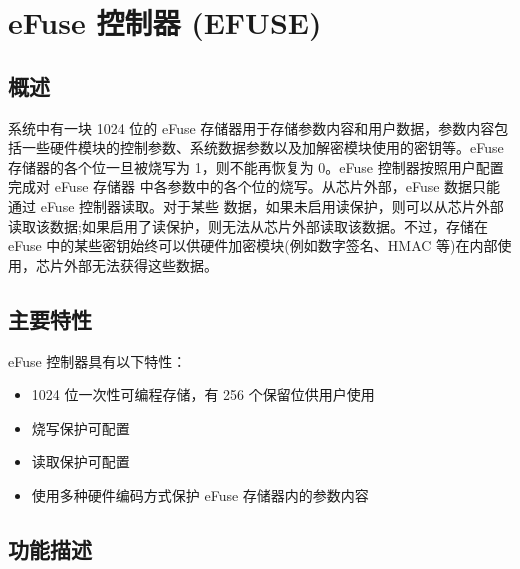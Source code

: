 \documentclass[main\_\_CN.tex]{subfiles}
\begin{document}

\ifglobal
\else
    {\let\clearpage\relax \listoftodos}
    {\let\clearpage\relax \listofdonetodos}
    \tableofcontents
\fi



\hypertarget{efuse}{}
\chapter{eFuse 控制器 (EFUSE)}
\label{mod:efuse}

\section{概述}

\chipname{} 系统中有一块 1024 位的 eFuse 存储器用于存储参数内容和用户数据，参数内容包括一些硬件模块的控制参数、系统数据参数以及加解密模块使用的密钥等。eFuse 存储器的各个位一旦被烧写为 1，则不能再恢复为 0。eFuse 控制器按照用户配置完成对 eFuse 存储器 中各参数中的各个位的烧写。从芯片外部，eFuse 数据只能通过 eFuse 控制器读取。对于某些 数据，如果未启用读保护，则可以从芯片外部读取该数据;如果启用了读保护，则无法从芯片外部读取该数据。不过，存储在 eFuse 中的某些密钥始终可以供硬件加密模块(例如数字签名、HMAC 等)在内部使用，芯片外部无法获得这些数据。

\section{主要特性}

eFuse 控制器具有以下特性：

\begin{itemize}
    \item 1024 位一次性可编程存储，有 256 个保留位供用户使用
    \item 烧写保护可配置
    \item 读取保护可配置
    \item 使用多种硬件编码方式保护 eFuse 存储器内的参数内容
\end{itemize}

\section{功能描述}
\end{document}
